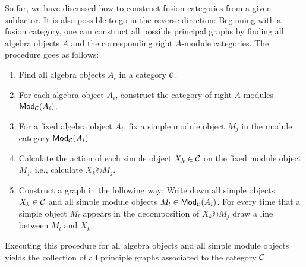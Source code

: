 So far, we have discussed how to construct fusion categories from a given subfactor. It is also possible to go in the reverse direction: Beginning with a fusion category, one can construct all possible principal graphs by finding all algebra objects $A$ and the corresponding right $A$-module categories. The procedure goes as follows:
	\begin{enumerate}
		\item[1.] Find all algebra objects $A_i$ in a category ${\mathcal{C}}$.
		\item[2.] For each algebra object $A_i$, construct the category of right $A$-modules $\mathsf{Mod}_{\mathcal{C}}(A_i)$.
		\item[3.] For a fixed algebra object $A_i$, fix a simple module object $M_j$ in the module category $\mathsf{Mod}_{\mathcal{C}}(A_i)$.
		\item[4.] Calculate the action of each simple object $X_k\in{\mathcal{C}}$ on the fixed module object $M_j$, i.e., calculate $X_k\circlearrowright M_j$.
		\item[5.] Construct a graph in the following way: Write down all simple objects $X_k\in{\mathcal{C}}$ and all simple module objects $M_l\in\mathsf{Mod}_{\mathcal{C}}(A_i)$. For every time that a simple object $M_l$ appears in the decomposition of $X_k\circlearrowright M_j$ draw a line between $M_l$ and $X_k$.
	\end{enumerate}

Executing this procedure for all algebra objects and all simple module objects yields the collection of all principle graphs associated to the category ${\mathcal{C}}$.

